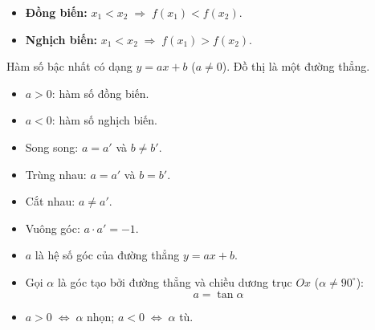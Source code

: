 \documentclass[12pt,a4paper]{article}
\begin{document}
\begin{tinhchat}[title={Tính đồng biến, nghịch biến}]
  \begin{itemize}
    \item \textbf{Đồng biến:} $x_1 < x_2 \;\Rightarrow\; f(x_1) < f(x_2)$.
    \item \textbf{Nghịch biến:} $x_1 < x_2 \;\Rightarrow\; f(x_1) > f(x_2)$.
  \end{itemize}
\end{tinhchat}

\begin{dinhnghia}[title={Hàm số bậc nhất}]
  Hàm số bậc nhất có dạng $y = ax + b$ \;($a \ne 0$). Đồ thị là một đường thẳng.
  \begin{itemize}
    \item $a > 0$: hàm số đồng biến.
    \item $a < 0$: hàm số nghịch biến.
  \end{itemize}
\end{dinhnghia}

\begin{tinhchat}[title={Vị trí tương đối giữa hai đường thẳng $y = ax + b$ và $y = a'x + b'$}]
  \begin{itemize}
    \item Song song: $a = a'$ và $b \ne b'$.
    \item Trùng nhau: $a = a'$ và $b = b'$.
    \item Cắt nhau: $a \ne a'$.
    \item Vuông góc: $a \cdot a' = -1$.
  \end{itemize}
\end{tinhchat}

\begin{congthuc}[title={Hệ số góc của đường thẳng}]
  \begin{itemize}
    \item $a$ là hệ số góc của đường thẳng $y = ax + b$.
    \item Gọi $\alpha$ là góc tạo bởi đường thẳng và chiều dương trục $Ox$ ($\alpha \ne 90^\circ$):
      \[a = \tan\alpha\]
    \item $a > 0 \;\Leftrightarrow\; \alpha$ nhọn; \quad $a < 0 \;\Leftrightarrow\; \alpha$ tù.
  \end{itemize}
\end{congthuc}
\end{document}
